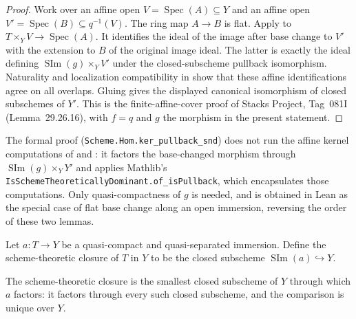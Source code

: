 \begin{proof}
  \leanok
  Work over an affine open $V=\operatorname{Spec}(A)\subseteq Y$ and an
  affine open $V'=\operatorname{Spec}(B)\subseteq q^{-1}(V)$.  The ring map
  $A\to B$ is flat.  Apply
   to
  $T\times_YV\to\operatorname{Spec}(A)$.  It identifies the ideal of the
  image after base change to $V'$ with the extension to $B$ of the original
  image ideal.  The latter is exactly the ideal defining
  $\operatorname{SIm}(g)\times_YV'$ under the closed-subscheme pullback
  isomorphism.  Naturality and localization compatibility in
   show that these affine
  identifications agree on all overlaps.  Gluing gives the displayed
  canonical isomorphism of closed subschemes of $Y'$.  This is the
  finite-affine-cover proof of Stacks Project, Tag~081I
  (Lemma~29.26.16), with $f=q$ and $g$ the morphism in the present statement.
\end{proof}

\begin{remark}
  The formal proof (\texttt{Scheme.Hom.ker\_pullback\_snd}) does not run
  the affine kernel computations of
   and
  : it factors the base-changed
  morphism through $\operatorname{SIm}(g)\times_YY'$ and applies Mathlib's
  \texttt{IsSchemeTheoreticallyDominant.of\_isPullback}, which encapsulates
  those computations.  Only quasi-compactness of $g$ is needed, and
   is obtained in Lean as the
  special case of flat base change along an open immersion, reversing the
  order of these two lemmas.
\end{remark}

\begin{definition}
  \label{def:nagata-scheme-theoretic-closure}
  \leanok

  Let $a\colon T\to Y$ be a quasi-compact and quasi-separated immersion.
  Define the scheme-theoretic closure of $T$ in $Y$ to be the closed
  subscheme $\operatorname{SIm}(a)\hookrightarrow Y$.
\end{definition}

\begin{lemma}
  \label{lemma:nagata-scheme-theoretic-closure-minimal}
  \leanok

  The scheme-theoretic closure is the smallest closed subscheme of $Y$
  through which $a$ factors: it factors through every such closed subscheme,
  and the comparison is unique over $Y$.
\end{lemma}

